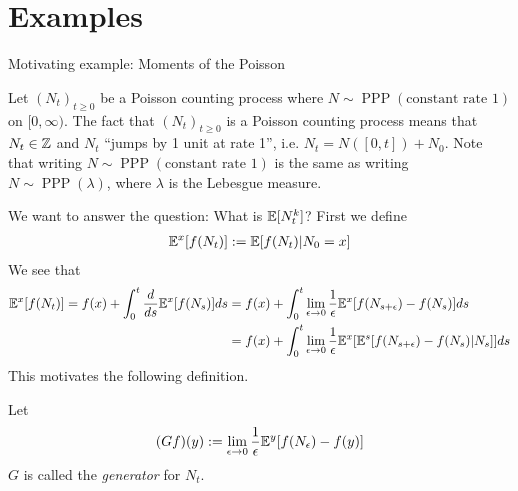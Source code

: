 \documentclass[classnotes]{fillsntsx}
\DeclareMathOperator{\PPP}{PPP}
\begin{document}
%





\section{Examples}

\begin{exmp}{Motivating example: Moments of the Poisson}

Let $(N_t)_{t \geq 0}$ be a Poisson counting process where $N \sim \PPP(\text{constant rate 1})$ on $[0, \infty)$. 
The fact that  $(N_t)_{t \geq 0}$ is a Poisson counting process means that
$N_t \in \mathbb{Z}$ and $N_t$ ``jumps by 1 unit at rate 1'', i.e. $N_t = N([0, t]) + N_0$. 
Note that writing $N \sim \PPP(\text{constant rate 1})$ is the same as writing $N \sim \PPP(\lambda)$, where $\lambda$
is the Lebesgue measure. 

We want to answer the question: What is $\mathbb{E}[N_t^k]$? First we define
$$\begin{aligned}
\mathbb{E}^x[f(N_t)] := \mathbb{E}[f(N_t) | N_0 = x ] 
\end{aligned}$$
We see that
\begin{align}
\mathbb{E}^x[f(N_t)] = f(x) + \int_0^t \frac{d}{ds} \mathbb{E}^x [f(N_s)] ds &= f(x) + \int_0^t  \lim_{\epsilon \to 0} \frac{1}{\epsilon} \mathbb{E}^x [f(N_{s+\epsilon}) - f(N_s)] ds\\
\label{condexp1}
&=  f(x) + \int_0^t  \lim_{\epsilon \to 0}   \frac{1}{\epsilon} \mathbb{E}^x [ \mathbb{E}^s [f(N_{s+\epsilon}) - f(N_s) | N_s] ] ds
\end{align}
This motivates the following definition.
\begin{defn} Let
$$\begin{aligned}
(Gf)(y) := \lim_{\epsilon \to 0} \frac{1}{\epsilon} \mathbb{E}^{y}[ f(N_\epsilon) - f(y) ] 
\end{aligned}$$
$G$ is called the {\em generator} for $N_t$. 
\end{defn}



\end{exmp}
\end{document}
